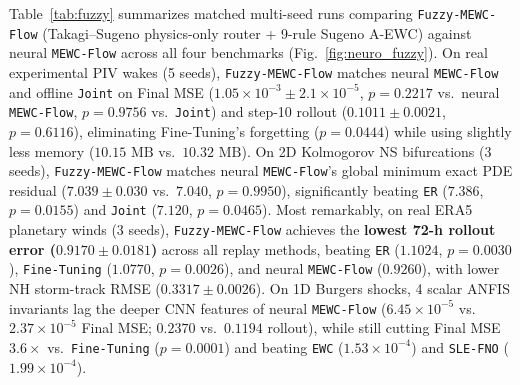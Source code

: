 \documentclass[11pt,a4paper]{article}
\begin{document}
Table~\ref{tab:fuzzy} summarizes matched multi-seed runs comparing \texttt{Fuzzy-MEWC-Flow} (Takagi--Sugeno physics-only router + 9-rule Sugeno A-EWC) against neural \texttt{MEWC-Flow} across all four benchmarks (Fig.~\ref{fig:neuro_fuzzy}). On real experimental PIV wakes (5 seeds), \texttt{Fuzzy-MEWC-Flow} matches neural \texttt{MEWC-Flow} and offline \texttt{Joint} on Final MSE ($1.05 \times 10^{-3} \pm 2.1 \times 10^{-5}$, $p = 0.2217$ vs.\ neural \texttt{MEWC-Flow}, $p = 0.9756$ vs.\ \texttt{Joint}) and step-10 rollout ($0.1011 \pm 0.0021$, $p = 0.6116$), eliminating Fine-Tuning's forgetting ($p = 0.0444$) while using slightly less memory ($10.15\text{ MB}$ vs.\ $10.32\text{ MB}$). On 2D Kolmogorov NS bifurcations (3 seeds), \texttt{Fuzzy-MEWC-Flow} matches neural \texttt{MEWC-Flow}'s global minimum exact PDE residual ($7.039 \pm 0.030$ vs.\ $7.040$, $p = 0.9950$), significantly beating \texttt{ER} ($7.386$, $p = 0.0155$) and \texttt{Joint} ($7.120$, $p = 0.0465$). Most remarkably, on real ERA5 planetary winds (3 seeds), \texttt{Fuzzy-MEWC-Flow} achieves the \textbf{lowest 72-h rollout error ($0.9170 \pm 0.0181$)} across all replay methods, beating \texttt{ER} ($1.1024$, $p = 0.0030$), \texttt{Fine-Tuning} ($1.0770$, $p = 0.0026$), and neural \texttt{MEWC-Flow} ($0.9260$), with lower NH storm-track RMSE ($0.3317 \pm 0.0026$). On 1D Burgers shocks, 4 scalar ANFIS invariants lag the deeper CNN features of neural \texttt{MEWC-Flow} ($6.45 \times 10^{-5}$ vs.\ $2.37 \times 10^{-5}$ Final MSE; $0.2370$ vs.\ $0.1194$ rollout), while still cutting Final MSE $3.6\times$ vs.\ \texttt{Fine-Tuning} ($p = 0.0001$) and beating \texttt{EWC} ($1.53 \times 10^{-4}$) and \texttt{SLE-FNO} ($1.99 \times 10^{-4}$).
\end{document}
